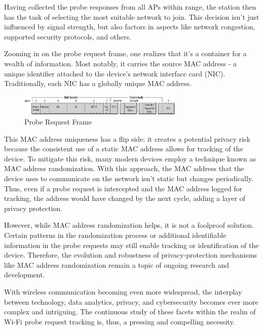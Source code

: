 \documentclass{article}
\begin{document}
Having collected the probe responses from all APs within range, the station then has the task of selecting the most suitable network to join. This decision isn't just influenced by signal strength, but also factors in aspects like network congestion, supported security protocols, and others. 

Zooming in on the probe request frame, one realizes that it's a container for a wealth of information. Most notably, it carries the source MAC address - a unique identifier attached to the device's network interface card (NIC). Traditionally, each NIC has a globally unique MAC address.

\begin{figure}[h]
    \centering
    \includegraphics[width=0.7\textwidth]{assets/probe-request-frame.png}
    \caption{Probe Request Frame}
    \label{fig:probe-request-frame}
\end{figure}

This MAC address uniqueness has a flip side: it creates a potential privacy risk because the consistent use of a static MAC address allows for tracking of the device. To mitigate this risk, many modern devices employ a technique known as MAC address randomization. With this approach, the MAC address that the device uses to communicate on the network isn't static but changes periodically. Thus, even if a probe request is intercepted and the MAC address logged for tracking, the address would have changed by the next cycle, adding a layer of privacy protection.

However, while MAC address randomization helps, it is not a foolproof solution. Certain patterns in the randomization process or additional identifiable information in the probe requests may still enable tracking or identification of the device. Therefore, the evolution and robustness of privacy-protection mechanisms like MAC address randomization remain a topic of ongoing research and development. 

With wireless communication becoming even more widespread, the interplay between technology, data analytics, privacy, and cybersecurity becomes ever more complex and intriguing. The continuous study of these facets within the realm of Wi-Fi probe request tracking is, thus, a pressing and compelling necessity.

\end{document}
